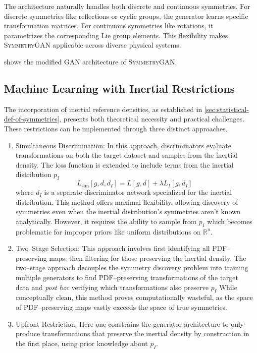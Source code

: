     The architecture naturally handles both discrete and continuous symmetries.
    For discrete symmetries like reflections or cyclic groups, the generator learns specific transformation matrices.
    For continuous symmetries like rotations, it parametrizes the corresponding Lie group elements.
    This flexibility makes \textsc{SymmetryGAN} applicable across diverse physical systems.

     shows the modified GAN architecture of \textsc{SymmetryGAN}.
    
    \subsection{Machine Learning with Inertial Restrictions}
    The incorporation of inertial reference densities, as established in \cref{sec:statistical-def-of-symmetries}, presents both theoretical necessity and practical challenges.
    These restrictions can be implemented through three distinct approaches.
    \begin{enumerate}
        \item Simultaneous Discrimination:
            In this approach, discriminators evaluate transformations on both the target dataset and samples from the inertial density.
            The loss function is extended to include terms from the inertial distribution \(p_I\)
            \[
                L_{\text{sim}}[g,d,d_I] = L[g,d] + \lambda L_I[g,d_I]
            \]
            where \(d_I\) is a separate discriminator network specialized for the inertial distribution.
            This method offers maximal flexibility, allowing discovery of symmetries even when the inertial distribution's symmetries aren't known analytically.
            However, it requires the ability to sample from \(p_I\) which becomes problematic for improper priors like uniform distributions on \(\mathbb{R}^n\).
        \item Two--Stage Selection:
            This approach involves first identifying all PDF--preserving maps, then filtering for those preserving the inertial density.
            The two--stage approach decouples the symmetry discovery problem into training multiple generators to find PDF--preserving transformations of the target data and \textit{post hoc} verifying which transformations also preserve \(p_I\)
            While conceptually clean, this method proves computationally wasteful, as the space of PDF--preserving maps vastly exceeds the space of true symmetries.
        \item Upfront Restriction:
            Here one constrains the generator architecture to only produce transformations that preserve the inertial density by construction in the first place, using prior knowledge about \(p_I\).
    \end{enumerate}

